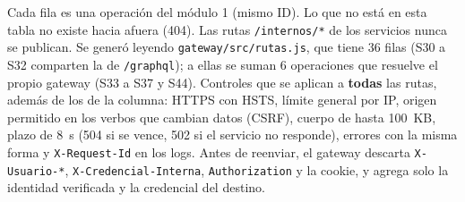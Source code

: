 Cada fila es una operación del módulo 1 (mismo ID). Lo que no está en esta tabla no existe hacia afuera (404). Las rutas \texttt{/\allowbreak{}internos/\allowbreak{}*} de los servicios nunca se publican. Se generó leyendo \texttt{gateway/\allowbreak{}src/\allowbreak{}rutas.\allowbreak{}js}, que tiene 36 filas (S30 a S32 comparten la de \texttt{/\allowbreak{}graphql}); a ellas se suman 6 operaciones que resuelve el propio gateway (S33 a S37 y S44). Controles que se aplican a \textbf{todas} las rutas, además de los de la columna: HTTPS con HSTS, límite general por IP, origen permitido en los verbos que cambian datos (CSRF), cuerpo de hasta 100~KB, plazo de 8~s (504 si se vence, 502 si el servicio no responde), errores con la misma forma y \texttt{X-\allowbreak{}Request-\allowbreak{}Id} en los logs. Antes de reenviar, el gateway descarta \texttt{X-\allowbreak{}Usuario-\allowbreak{}*}, \texttt{X-\allowbreak{}Credencial-\allowbreak{}Interna}, \texttt{Authorization} y la cookie, y agrega solo la identidad verificada y la credencial del destino.


